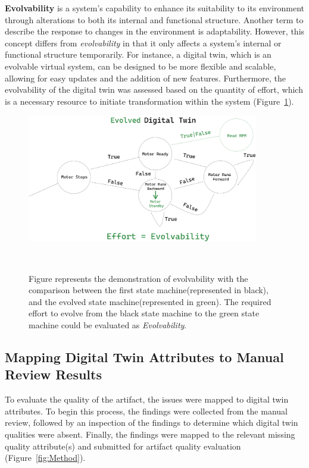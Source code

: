 \documentclass{llncs}
\begin{document}
    \textbf{Evolvability} is a system's capability to enhance its suitability to its environment through alterations to both its internal and functional 
    structure\cite{MobusSystemTheory}. Another term to describe the response to changes in the environment is adaptability.
    However, this concept differs from \textit{evolvability} in that it only affects a system's internal or functional structure temporarily. 
    For instance, a digital twin, which is an evolvable virtual system, can be designed to be more flexible and scalable, 
    allowing for easy updates and the addition of new features\cite{ZHANGUPDATEMETHOD}. 
    Furthermore, the evolvability of the digital twin was assessed based on the quantity of effort, which is a necessary resource to initiate transformation
    within the system (Figure~\ref{fig:Evolvability}). 
    \begin{figure}[htbp]
        \centering
        \includegraphics[width = 0.9\textwidth]{Evolvability.png}
        \caption{Figure represents the demonstration of evolvability with the comparison between the first state machine(represented in black), and the evolved state machine(represented in green). The required effort
        to evolve from the black state machine to the green state machine could be evaluated as \textit{Evolvability}.}~\label{fig:Evolvability}
    \end{figure}
    \subsection{Mapping Digital Twin Attributes to Manual Review Results}
    To evaluate the quality of the artifact, the issues were mapped to digital twin attributes. 
    To begin this process, the findings were collected from the manual review, followed by an inspection of the findings to determine which digital twin qualities were absent. 
    Finally, the findings were mapped to the relevant missing quality attribute(s) and submitted for artifact quality evaluation (Figure~\ref{fig:Method}).
\end{document}
